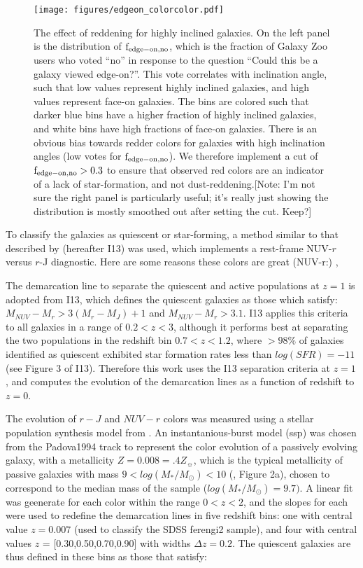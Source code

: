 \begin{figure}
\centering
\texttt{[image: figures/edgeon\_colorcolor.pdf]}
\caption{The effect of reddening for highly inclined galaxies. On the left panel is the distribution of $\rm f_{edge-on,no}$, which is the fraction of Galaxy Zoo users who voted ``no'' in response to the question ``Could this be a galaxy viewed edge-on?''. This vote correlates with inclination angle, such that low values represent highly inclined galaxies, and high values represent face-on galaxies. The bins are colored such that darker blue bins have a higher fraction of highly inclined galaxies, and white bins have high fractions of face-on galaxies. There is an obvious bias towards redder colors for galaxies with high inclination angles (low votes for $\rm f_{edge-on,no}$). We therefore implement a cut of $\rm f_{edge-on,no}>0.3$ to ensure that observed red colors are an indicator of a lack of star-formation, and not dust-reddening.[Note: I'm not sure the right panel is particularly useful; it's really just showing the distribution is mostly smoothed out after setting the cut. Keep?] }
\label{fig:edgeon}
\end{figure}
To classify the galaxies as quiescent or star-forming, a method similar to that described by \citet{Ilbert2013} (hereafter I13) was used, which implements a rest-frame NUV-$r$ versus $r$-J diagnostic. Here are some reasons these colors are great (NUV-r:) \citep{Arnouts2007a,Salim2005a,Wyder2007},\citep{Martin2007}

The demarcation line to separate the quiescent and active populations at $z=1$ is adopted from I13, which defines the quiescent galaxies as those which satisfy: $M_{NUV}-M_{r} > 3(M_{r}-M_{J})+1$ and $M_{NUV}-M_{r} > 3.1$. I13 applies this criteria to all galaxies in a range of $0.2<z<3$, although it performs best at separating the two populations in the redshift bin $0.7<z<1.2$, where $>98\%$ of galaxies identified as quiescent exhibited star formation rates less than $log(SFR) = -11$ (see Figure 3 of I13). Therefore this work uses the I13 separation criteria at $z=1$, and computes the evolution of the demarcation lines as a function of redshift to $z=0$. 

The evolution of $r-J$ and $NUV-r$ colors was measured using a stellar population synthesis model from \citet{Bruzual2003}. An instantanious-burst model (ssp) was chosen from the Padova1994 track to represent the color evolution of a passively evolving galaxy, with a metallicity $Z=0.008=.4Z_{\sun}$, which is the typical metallicity of passive galaxies with mass $9 < log(M_{*}/M_{\odot}) < 10$ (\citet{Peng2015}, Figure 2a), chosen to correspond to the median mass of the sample ($log(M_{*}/M_{\odot})=9.7)$. A linear fit was geenerate for each color within the range $0<z<2$, and the slopes for each were used to redefine the demarcation lines in five redshift bins: one with central value $z=0.007$ (used to classify the SDSS ferengi2 sample), and four with central values $z$ = [0.30,0.50,0.70,0.90] with widths $\Delta z=0.2$. The quiescent galaxies are thus defined in these bins as those that satisfy:

